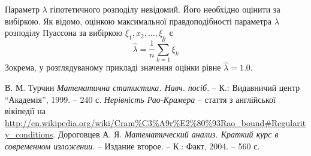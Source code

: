 \documentclass[12pt]{article} %
\begin{document}
	Параметр $\lambda$ гіпотетичного розподілу невідомий. Його необхідно оцінити за вибіркою. Як відомо, оцінкою максимальної правдоподібності
	параметра $\lambda$ розподілу Пуассона за вибіркою $\xi_1,x_2,\hdots,\xi_n$ є
	\[\hat{\lambda}=\frac{1}{n}\sum_{k=1}^n\xi_k\]
	Зокрема, у розглядуваному прикладі значення оцінки рівне $\hat{\lambda}=1.0$.
\begin{thebibliography}{9}
В. М. Турчин \emph{Математична статистика. Навч. посіб.} --
К.: Видавничий центр ``Академія'', 1999. -- 240 с.
{\em Нерівність Рао-Крамера} -- стаття з англійської вікіпедії на
\url{http://en.wikipedia.org/wiki/Cram%C3%A9r%E2%80%93Rao_bound#Regularity_conditions}.
Дороговцев А. Я. {\em Математический анализ. Краткий курс в современном изложении}. -- Издание второе. --
	К.: Факт, 2004. -- 560 с.
\end{thebibliography}
\end{document}
